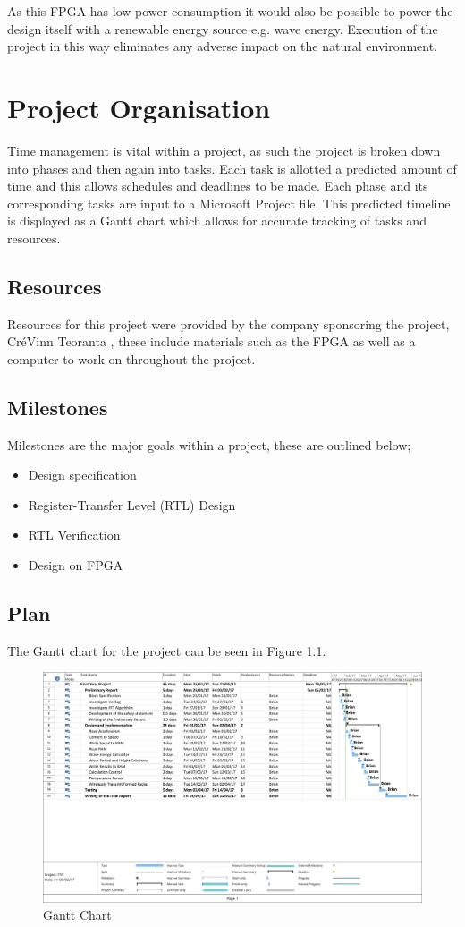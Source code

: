 \documentclass[12pt,a4paper]{report} %
\begin{document}
As this FPGA has low power consumption it would also be possible to power the design itself with a renewable energy source e.g. wave energy. Execution of the project in this way eliminates any adverse impact on the natural environment.

\section{Project Organisation}
Time management is vital within a project, as such the project is broken down into phases and then again into tasks.
Each task is allotted a predicted amount of time and this allows schedules and deadlines to be made.
Each phase and its corresponding tasks are input to a Microsoft Project file.
This predicted timeline is displayed as a Gantt chart which allows for accurate tracking of tasks and resources.
\subsection{Resources}
Resources for this project were provided by the company sponsoring the project, CréVinn Teoranta \cite{crevinn}, these include materials such as the FPGA as well as a computer to work on throughout the project.
\subsection{Milestones}
Milestones are the major goals within a project, these are outlined below;
\begin{itemize}
\item Design specification
\item Register-Transfer Level (RTL) Design
\item RTL Verification
\item Design on FPGA
\end{itemize}
\subsection{Plan}
The Gantt chart for the project can be seen in Figure 1.1.
\begin{figure}[ht]
\centerline{\includegraphics[angle=90,scale=0.6]{diagrams/gantt}}
\caption{Gantt Chart}
\end{figure}
\end{document}
